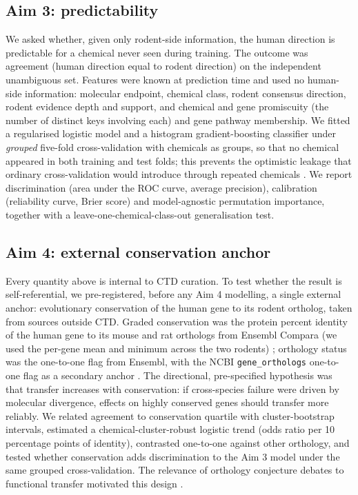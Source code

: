 \documentclass[review,12pt,authoryear]{elsarticle}
\begin{document}
\subsection{Aim 3: predictability}

We asked whether, given only rodent-side information, the human direction is
predictable for a chemical never seen during training. The outcome was
agreement (human direction equal to rodent direction) on the independent
unambiguous set. Features were known at prediction time and used no human-side
information: molecular endpoint, chemical class, rodent consensus direction,
rodent evidence depth and support, and chemical and gene promiscuity (the number
of distinct keys involving each) and gene pathway membership. We fitted a
regularised logistic model and a histogram gradient-boosting classifier
\citep{friedman2001gbm,ke2017lightgbm,pedregosa2011sklearn} under
\emph{grouped} five-fold cross-validation with chemicals as groups, so that no
chemical appeared in both training and test folds; this prevents the optimistic
leakage that ordinary cross-validation would introduce through repeated
chemicals \citep{kaufman2012leakage}. We report discrimination (area under the
ROC curve, average precision), calibration (reliability curve, Brier score) and
model-agnostic permutation importance, together with a leave-one-chemical-class-out
generalisation test.

\subsection{Aim 4: external conservation anchor}

Every quantity above is internal to CTD curation. To test whether the result is
self-referential, we pre-registered, before any Aim 4 modelling, a single
external anchor: evolutionary conservation of the human gene to its rodent
ortholog, taken from sources outside CTD. Graded conservation was the protein
percent identity of the human gene to its mouse and rat orthologs from Ensembl
Compara (we used the per-gene mean and minimum across the two rodents)
\citep{austine2025ensembl}; orthology status was the one-to-one flag from
Ensembl, with the NCBI \texttt{gene\_orthologs} one-to-one flag as a secondary
anchor \citep{brown2015ncbigene}. The directional, pre-specified hypothesis was
that transfer increases with conservation: if cross-species failure were driven
by molecular divergence, effects on highly conserved genes should transfer more
reliably. We related agreement to conservation quartile with cluster-bootstrap
intervals, estimated a chemical-cluster-robust logistic trend (odds ratio per 10
percentage points of identity), contrasted one-to-one against other orthology,
and tested whether conservation adds discrimination to the Aim 3 model under the
same grouped cross-validation. The relevance of orthology conjecture debates to
functional transfer motivated this design \citep{nehrt2011,chen2012ortholog}.
\end{document}
